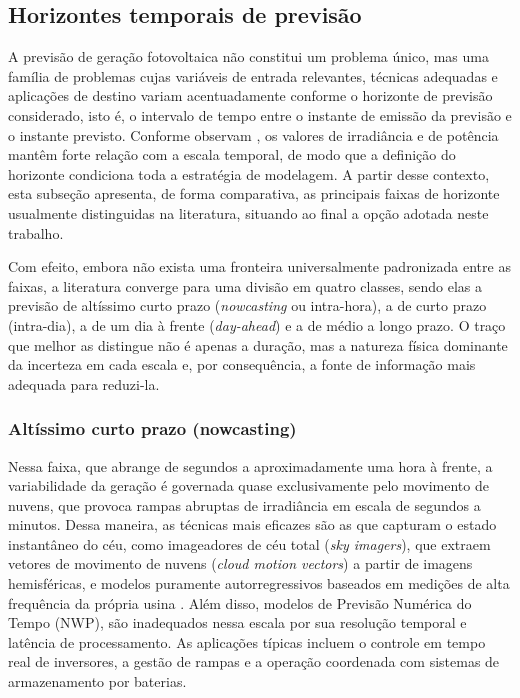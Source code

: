 \subsection{Horizontes temporais de previsão}
\label{subsec:horizontes_temporais}



A previsão de geração fotovoltaica não constitui um problema único, mas uma família de
problemas cujas variáveis de entrada relevantes, técnicas adequadas e
aplicações de destino variam acentuadamente conforme o horizonte de previsão
considerado, isto é, o intervalo de tempo entre o instante de emissão da previsão e o
instante previsto. Conforme observam , os valores de irradiância e
de potência mantêm forte relação com a escala temporal, de modo que a definição do
horizonte condiciona toda a estratégia de modelagem. A partir desse contexto, esta subseção apresenta, de forma
comparativa, as principais faixas de horizonte usualmente distinguidas na literatura,
situando ao final a opção adotada neste trabalho.

Com efeito, embora não exista uma fronteira universalmente padronizada entre as faixas, a literatura
converge para uma divisão em quatro classes, sendo elas a previsão de altíssimo curto prazo
(\emph{nowcasting} ou intra-hora), a de curto prazo (intra-dia), a de um dia à frente
(\emph{day-ahead}) e a de médio a longo prazo. O traço que melhor as distingue não é apenas
a duração, mas a natureza física dominante da incerteza em cada escala e, por
consequência, a fonte de informação mais adequada para reduzi-la.

\subsubsection*{Altíssimo curto prazo (nowcasting)}

Nessa faixa, que abrange de segundos a aproximadamente uma hora à frente, a variabilidade
da geração é governada quase exclusivamente pelo movimento de nuvens, que provoca rampas
abruptas de irradiância em escala de segundos a minutos. Dessa maneira, as técnicas mais eficazes são as
que capturam o estado instantâneo do céu, como imageadores de céu total (\emph{sky imagers}),
que extraem vetores de movimento de nuvens (\emph{cloud motion vectors}) a partir de
imagens hemisféricas, e modelos puramente autorregressivos baseados em medições de alta
frequência da própria usina \cite{Tian2023}. Além disso, modelos de Previsão Numérica do Tempo (NWP),
são inadequados nessa escala por sua resolução temporal e latência de processamento. As
aplicações típicas incluem o controle em tempo real de inversores, a gestão de rampas e a
operação coordenada com sistemas de armazenamento por baterias.

